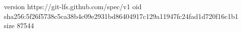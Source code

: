 version https://git-lfs.github.com/spec/v1
oid sha256:5f26f5738c5ca38b4c09e2931bd86404917c129a11947fc24fad1d720f16c1b1
size 87544
